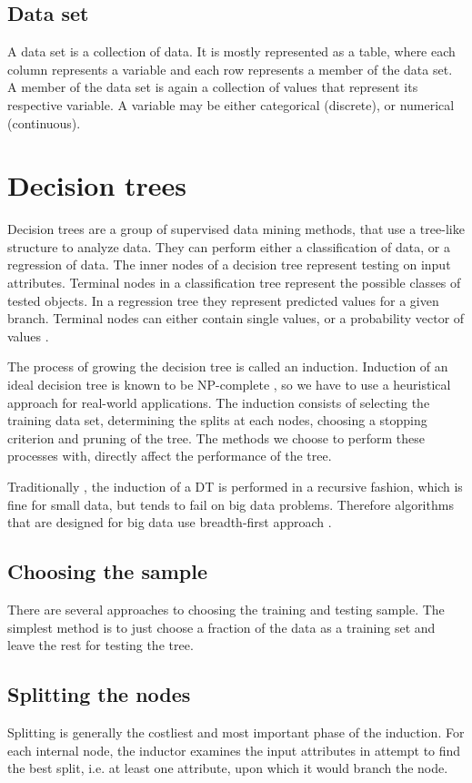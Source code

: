 \documentclass[thesis=B,english]{FITthesis}[2012/10/20]
\begin{document}
\section{Data set}
A data set is a collection of data. It is mostly represented as a table, where each column represents a variable and each row represents a member of the data set. A member of the data set is again a collection of values that represent its respective variable. A variable may be either categorical (discrete), or numerical (continuous).
\chapter{Decision trees}
\label{chap:DT}
		Decision trees are a group of supervised data mining methods, that use a tree-like structure to analyze data. They can perform either a classification of data, or a regression of data. The inner nodes of a decision tree represent testing on input attributes. \cite{CMP07} Terminal nodes in a classification tree represent the possible classes of tested objects. In a regression tree they represent predicted values for a given branch. Terminal nodes can either contain single values, or a probability vector of values \cite{TOP_DOWN_INDUCTION_SURVEY}. 

		The process of growing the decision tree is called an induction. Induction of an ideal decision tree is known to be NP-complete \cite{NP-COMPLETE}, so we have to use a heuristical approach for real-world applications. The induction consists of selecting the training data set, determining the splits at each nodes, choosing a stopping criterion and pruning of the tree. The methods we choose to perform these processes with, directly affect the performance of the tree. 

		Traditionally \cite{CART,C45-NUMERICAL}, the induction of a DT is performed in a recursive fashion, which is fine for small data, but tends to fail on big data problems. Therefore algorithms that are designed for big data use breadth-first approach \cite{mehta1996sliq,ben2010streaming}.

		\section{Choosing the sample}
			There are several approaches to choosing the training and testing sample. The simplest method is to just choose a fraction of the data as a training set and leave the rest for testing the tree. 
		
		\section{Splitting the nodes}
			Splitting is generally the costliest and most important phase of the induction. For each internal node, the inductor examines the input attributes in attempt to find the best split, i.e. at least one attribute, upon which it would branch the node. 
\end{document}
